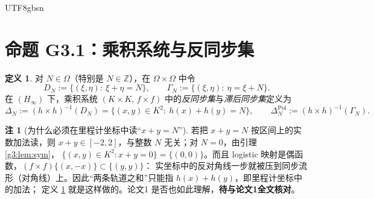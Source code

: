 \documentclass[11pt,a4paper]{article}
\newcommand{\Om}{\Omega}               %
\theoremstyle{plain}
\theoremstyle{definition}
\newtheorem{defn}[lem]{定义}
\newtheorem{rem}[lem]{注}
\begin{document}
\begin{CJK}{UTF8}{gbsn}
\section{命题 G3.1：乘积系统与反同步集}\label{g3:sec:construct}

\begin{defn}\label{g3:defn:delta}
对 $N\in\Om$（特别是 $N\in\mathbb Z$），在 $\Om\times\Om$ 中令
\[
D_N:=\{(\xi,\eta):\ \xi+\eta=N\},\qquad \Gamma_N:=\{(\xi,\eta):\ \eta=\xi+N\}.
\]
在 $(H_\infty)$ 下，乘积系统 $(K\times K,\,f\times f)$ 中的\emph{反同步集}与\emph{滞后同步集}定义为
\[
\Delta_N:=(h\times h)^{-1}(D_N)=\{(x,y)\in K^2:\ h(x)+h(y)=N\},\qquad
\Delta_N^{\mathrm{Pol}}:=(h\times h)^{-1}(\Gamma_N).
\]
\end{defn}

\begin{rem}[为什么必须在里程计坐标中读“$x+y=N$”]\label{g3:rem:literal}
若把 $x+y=N$ 按区间上的实数加法读，则 $x+y\in[-2,2]$，与整数 $N$ 无关；对 $N=0$，由引理 \ref{g3:lem:sym}，
$\{(x,y)\in K^2:x+y=0\}=\{(0,0)\}$。而且 logistic 映射是偶函数，$(f\times f)\{(x,-x)\}\subset\{(y,y)\}$：
实坐标中的反对角线一步就被压到同步流形（对角线）上。因此“两条轨道之和”只能指 $h(x)+h(y)$，即里程计坐标中的加法；
定义 \ref{g3:defn:delta} 就是这样做的。论文1 是否也如此理解，\textbf{待与论文1全文核对}。
\end{rem}


\end{CJK}
\end{document}
